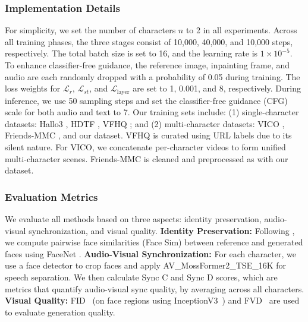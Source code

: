 \subsubsection{Implementation Details}
For simplicity, we set the number of characters $n$ to 2 in all experiments. Across all training phases, the three stages consist of 10,000, 40,000, and 10,000 steps, respectively. The total batch size is set to 16, and the learning rate is $1 \times 10^{-5}$. To enhance classifier-free guidance, the reference image, inpainting frame, and audio are each randomly dropped with a probability of 0.05 during training.
The loss weights for $\mathcal{L}_r$, $\mathcal{L}_{st}$, and $\mathcal{L}_{\text{layer}}$ are set to 1, 0.001, and 8, respectively.
During inference, we use 50 sampling steps and set the classifier-free guidance (CFG) scale for both audio and text to 7.
Our training sets include: (1) single-character datasets: Hallo3 \cite{cuiHallo3HighlyDynamic2025}, HDTF \cite{zhang2021flow}, VFHQ \cite{xie2022vfhq}; and (2) multi-character datasets: VICO \cite{zhou2022responsive}, Friends-MMC \cite{wang2025friends}, and our dataset. VFHQ is curated using URL labels due to its silent nature. For VICO, we concatenate per-character videos to form unified multi-character scenes. Friends-MMC is cleaned and preprocessed as with our dataset.

\subsubsection{Evaluation Metrics}
We evaluate all methods based on three aspects: identity preservation, audio-visual synchronization, and visual quality.
\textbf{Identity Preservation:} Following \cite{yuan_identity-preserving_2024,fei_ingredients_2025}, we compute pairwise face similarities (Face Sim) between reference and generated faces using FaceNet \cite{schroff2015facenet}.
\textbf{Audio-Visual Synchronization:} For each character, we use a face detector \cite{yolov8_ultralytics} to crop faces and apply AV\_MossFormer2\_TSE\_16K \cite{clearvoice_2025} for speech separation. We then calculate Sync C and Sync D scores, which are metrics that quantify audio-visual sync quality, by averaging across all characters.
\textbf{Visual Quality:} FID~\cite{heusel2017gans} (on face regions using InceptionV3~\cite{szegedy2016rethinking}) and FVD~\cite{unterthiner2019fvd} are used to evaluate generation quality.
